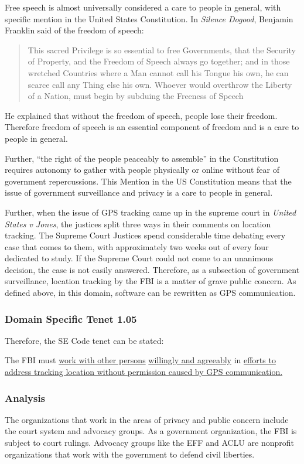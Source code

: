 \documentclass[12pt]{article}
\newcounter{subsubsubsection}[subsubsection]
\begin{document}
\begin{multicols}{2}
Free speech is almost universally considered a care to people in general, with specific mention in the United States Constitution. \cite{constitution}
In \textit{Silence Dogood}, Benjamin Franklin said of the freedom of speech: 
\begin{quote}
This sacred Privilege is so essential to free Governments, that the Security of Property, and the Freedom of Speech always go together; and in those wretched Countries where a Man cannot call his Tongue his own, he can scarce call any Thing else his own. Whoever would overthrow the Liberty of a Nation, must begin by subduing the Freeness of Speech
\end{quote}
\cite{silence_dogood}
He explained that without the freedom of speech, people lose their freedom.
Therefore freedom of speech is an essential component of freedom and is a care to people in general.

Further, ``the right of the people peaceably to assemble'' in the Constitution requires autonomy to gather with people physically or online without fear of government repercussions. \cite{constitution}
This Mention in the US Constitution means that the issue of government surveillance and privacy is a care to people in general.

Further, when the issue of GPS tracking came up in the supreme court in \textit{United States v Jones}, the justices split three ways in their comments on location tracking. \cite{usvjonesopinions}
The Supreme Court Justices spend considerable time debating every case that comes to them, with approximately two weeks out of every four dedicated to study. \cite{supreme_court_procedures}
If the Supreme Court could not come to an unanimous decision, the case is not easily answered.
Therefore, as a subsection of government surveillance, location tracking by the FBI is a matter of grave public concern.
As defined above, in this domain, software can be rewritten as GPS communication.
\subsubsection{Domain Specific Tenet 1.05}
Therefore, the SE Code tenet can be stated: 
\begin{framed}
The FBI must \uline{work with other persons} \uline{willingly and agreeably} in \uline{efforts to address tracking location without permission caused by GPS communication.}
\end{framed}
\subsubsection{Analysis}
The organizations that work in the areas of privacy and public concern include the court system and advocacy groups. As a government organization, the FBI is subject to court rulings. Advocacy groups like the EFF and ACLU are nonprofit organizations that work with the government to defend civil liberties. \cite{eff_mission, aclu_mission}


\end{multicols}
\end{document}

